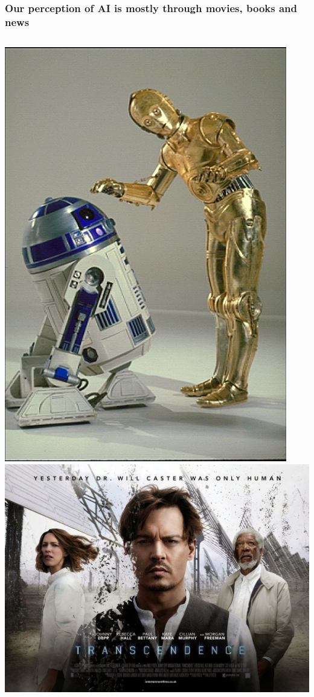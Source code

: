 \documentclass{beamer}
\begin{document}
\begin{frame}
  \frametitle{Our perception of AI is mostly through movies, books and news}
  \begin{columns}
    \includegraphics[width=\textwidth]{R2D2.png}
    \includegraphics[width=\textwidth]{Transcedence.png}
  \end{columns}
\end{frame}
\end{document}

